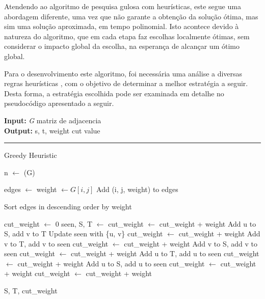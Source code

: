 \documentclass[mirror]{revdetua}
\begin{document}
Atendendo ao algoritmo de pesquisa gulosa com heurísticas, este segue uma abordagem diferente, uma vez que não garante a obtenção da solução ótima, mas sim uma solução aproximada, em tempo polinomial. Isto acontece devido à natureza do algoritmo, que em cada etapa faz escolhas localmente ótimas, sem considerar o impacto global da escolha, na esperança de alcançar um ótimo global.

Para o desenvolvimento este algoritmo, foi necessária uma análise a diversas regras heurísticas \cite{WANG23}, com o objetivo de determinar a melhor estratégia a seguir. Desta forma, a estratégia escolhida pode ser examinada em detalhe no pseudocódigo apresentado a seguir.

\begin{algorithm}
    \raggedright
    \textbf{Input:} \textit{G} matriz de adjacencia \\
    \textbf{Output:} s, t, weight cut value \\
    \hrule 
    \caption{Greedy Heuristic}
    \begin{algorithmic}[1]
    
        \State n $\gets$ (G)

        \State edges $\gets$ 
                \State weight $\gets G[i, j]$
                \State Add (i, j, weight) to edges
            \EndFor
        \EndFor

        \State Sort edges in descending order by weight

        \State cut\_weight $\gets$ 0
        \State seen, S, T $\gets$ 
                \State cut\_weight $\gets$ cut\_weight + weight
                \State Add u to S, add v to T
                \State Update seen with \{u, v\}
                \State cut\_weight $\gets$ cut\_weight + weight
                \State Add v to T, add v to seen
                \State cut\_weight $\gets$ cut\_weight + weight
                \State Add v to S, add v to seen
                \State cut\_weight $\gets$ cut\_weight + weight
                \State Add u to T, add u to seen
                \State cut\_weight $\gets$ cut\_weight + weight
                \State Add u to S, add u to seen
                \State cut\_weight $\gets$ cut\_weight + weight
            \State cut\_weight $\gets$ cut\_weight + weight
            \Else
            \EndIf
        \EndFor

        \State \Return S, T, cut\_weight
    
    \end{algorithmic}
\end{algorithm}
\end{document}
